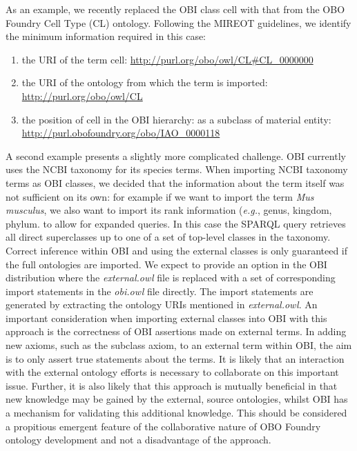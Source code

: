 \documentclass{elsart}       %
\begin{document}
As an example, we recently replaced the OBI class cell with that from the OBO Foundry Cell Type (CL) ontology\cite{cell}. 
Following the MIREOT guidelines, we identify the minimum information required in this case: 
\begin{enumerate}
\item the URI of the term cell: \url{http://purl.org/obo/owl/CL#CL_0000000}
\item the URI of the ontology from which the term is imported: \url{http://purl.org/obo/owl/CL}
\item the position of cell in the OBI hierarchy: as a subclass of material entity: \url{http://purl.obofoundry.org/obo/IAO_0000118} 
\end{enumerate}

A second example presents a slightly more complicated challenge.
OBI currently uses the NCBI taxonomy for its species terms.
When importing NCBI taxonomy terms as OBI classes, we decided that the information about the term itself was not sufficient on its own: for example if we want to import the term \emph{Mus musculus}, we also want to import its rank information (\emph{e.g.}, genus, kingdom, phylum. to allow for expanded queries.
In this case the SPARQL query retrieves all direct superclasses up to one of a set of top-level classes in the taxonomy. 
Correct inference within OBI and using the external classes is only guaranteed if the full ontologies are imported.
We expect to provide an option in the OBI distribution where the \emph{external.owl} file is replaced with a set of corresponding import statements in the \textit{obi.owl} file directly. 
The import statements are generated by extracting the ontology URIs mentioned in \emph{external.owl}. 
An important consideration when importing external classes into OBI with this approach is the correctness of OBI assertions made on external terms.
In adding new axioms, such as the subclass axiom, to an external term within OBI, the aim is to only assert true statements about the terms.
It is likely that an interaction with the external ontology efforts is necessary to collaborate on this important issue. Further, it is also likely that this approach is mutually beneficial in that new knowledge may be gained by the external, source ontologies, whilst OBI has a mechanism for validating this additional knowledge. This should be considered a propitious emergent feature of the collaborative nature of OBO Foundry ontology development and not a disadvantage of the approach.
\end{document}
